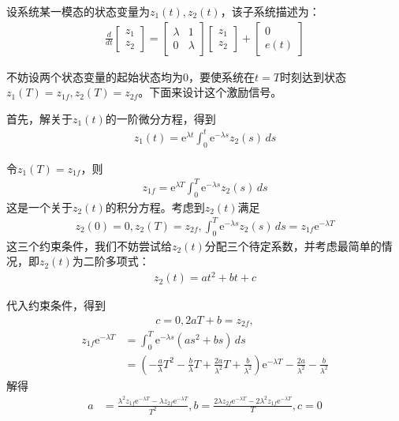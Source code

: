 \begin{example}
    设系统某一模态的状态变量为$z_1(t),z_2(t)$，该子系统描述为：\begin{align*}
    \frac{d}{dt}\begin{bmatrix}
    z_1\\
    z_2
    \end{bmatrix}=\begin{bmatrix}
    \lambda & 1\\
    0 & \lambda
    \end{bmatrix}\begin{bmatrix}
    z_1\\
    z_2
    \end{bmatrix}+\begin{bmatrix}
    0\\
    e(t)
    \end{bmatrix}
    \end{align*}

    不妨设两个状态变量的起始状态均为0，要使系统在$t=T$时刻达到状态$z_1(T)=z_{1f},z_2(T)=z_{2f}$。下面来设计这个激励信号。

    首先，解关于$z_1(t)$的一阶微分方程，得到\begin{align*}
    z_1(t)=\mathrm{e}^{\lambda t}\int_0^t \mathrm{e}^{-\lambda s}z_2(s)\,ds
    \end{align*}

    令$z_1(T)=z_{1f}$，则\begin{align*}
    z_{1f}=\mathrm{e}^{\lambda T}\int_0^T \mathrm{e}^{-\lambda s}z_2(s)\,ds
    \end{align*}
    这是一个关于$z_2(t)$的积分方程。考虑到$z_2(t)$满足\begin{align*}
    z_2(0)=0,z_2(T)=z_{2f},\int_{0}^T \mathrm{e}^{-\lambda s}z_2(s)\,ds=z_{1f}\mathrm{e}^{-\lambda T}
    \end{align*}
    这三个约束条件，我们不妨尝试给$z_2(t)$分配三个待定系数，并考虑最简单的情况，即$z_2(t)$为二阶多项式：\begin{align*}
    z_2(t)=a t^2+bt+c
    \end{align*}

    代入约束条件，得到\begin{align*}
    c=0,2aT+b=z_{2f},
    \end{align*}
    \begin{align*}
    z_{1f}\mathrm{e}^{-\lambda T}&=\int_0^T \mathrm{e}^{-\lambda s}(a s^2+bs)\,ds\\
    &=\left(-\frac{a}{\lambda}T^2-\frac{b}{\lambda}T+\frac{2a}{\lambda^2}T+\frac{b}{\lambda^2}\right)\mathrm{e}^{-\lambda T}-\frac{2a}{\lambda^2}-\frac{b}{\lambda^2}
    \end{align*}
    解得\begin{align*}
    a&=\frac{\lambda^2 z_{1f}\mathrm{e}^{-\lambda T}-\lambda z_{2f}\mathrm{e}^{-\lambda T}}{T^2},b=\frac{2\lambda z_{2f}\mathrm{e}^{-\lambda T}-2\lambda^2 z_{1f}\mathrm{e}^{-\lambda T}}{T},c=0
    \end{align*}


\end{example}
